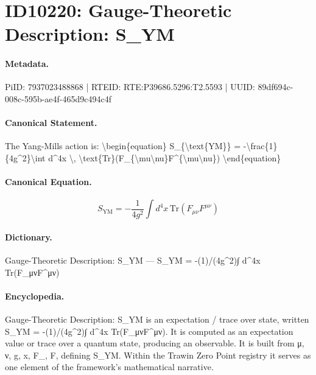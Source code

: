 \section*{ID10220: Gauge-Theoretic Description: S\_YM}
\paragraph{Metadata.}
PiID: 7937023488868 | RTEID: RTE:P39686.5296:T2.5593 | UUID: 89df694c-008c-595b-ae4f-465d9c494c4f

\paragraph{Canonical Statement.}
The Yang-Mills action is: \textbackslash{}begin\{equation\} S\_\{\textbackslash{}text\{YM\}\} = -\textbackslash{}frac\{1\}\{4g\textasciicircum{}2\}\textbackslash{}int d\textasciicircum{}4x \textbackslash{}, \textbackslash{}text\{Tr\}(F\_\{\textbackslash{}mu\textbackslash{}nu\}F\textasciicircum{}\{\textbackslash{}mu\textbackslash{}nu\}) \textbackslash{}end\{equation\}

\paragraph{Canonical Equation.}
\[
S_{\text{YM}} = -\frac{1}{4g^2}\int d^4x \, \text{Tr}(F_{\mu\nu}F^{\mu\nu})
\]

\paragraph{Dictionary.}
Gauge-Theoretic Description: S\_YM — S\_YM = -(1)/(4g\textasciicircum{}2)∫ d\textasciicircum{}4x Tr(F\_μνF\textasciicircum{}μν)

\paragraph{Encyclopedia.}
Gauge-Theoretic Description: S\_YM is an expectation / trace over state, written S\_YM = -(1)/(4g\textasciicircum{}2)∫ d\textasciicircum{}4x Tr(F\_μνF\textasciicircum{}μν). It is computed as an expectation value or trace over a quantum state, producing an observable. It is built from μ, ν, g, x, F\_, F, defining S\_YM. Within the Trawin Zero Point registry it serves as one element of the framework's mathematical narrative.
